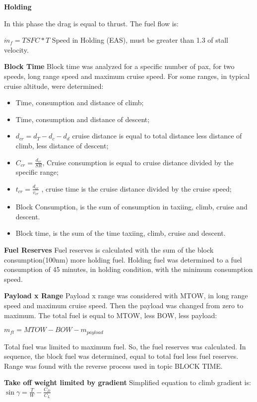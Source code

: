\textbf{Holding}

In this phase the drag is equal to thrust. The fuel flow is:

$\dot{m}_{f} = TSFC*T$
Speed in Holding (EAS), must be greater than 1.3 of stall velocity.

\textbf{Block Time}
Block time was analyzed for a specific number of pax, for two speeds, long range speed and maximum cruise speed.
	For some ranges, in typical cruise altitude, were determined:

\begin{itemize}
  \item Time, consumption and distance of climb;
  \item Time, consumption and distance of descent;
  \item $d_{cr} = d_{T} - d_{c} - d_{d}$ cruise distance is equal to total distance less distance of climb, less distance of descent;
  \item $C_{cr} = \frac{d_{cr}}{SR}$, Cruise consumption is equal to cruise distance divided by the specific range;
  \item $ t_{cr} = \frac{d_{cr}}{v_{cr}} $ , cruise time is the cruise distance divided by the cruise speed;

  \item Block Consumption, is the sum of consumption in taxiing, climb, cruise and descent.
  \item Block time, is the sum of the time taxiing, climb, cruise and descent.
\end{itemize}


\textbf{Fuel Reserves}
Fuel reserves is calculated with the sum of the block consumption(100nm) more holding fuel.
	Holding fuel was determined to a fuel consumption of 45 minutes, in holding condition, with the minimum consumption speed.
	
\textbf{Payload x Range}
Payload x range was considered with MTOW, in long range speed and maximum cruise speed. Then the payload was changed from zero to maximum.
	The total fuel is equal to MTOW, less BOW, less payload:
	
	$m_{ft} = MTOW - BOW - m_{payload}$
	
	Total fuel was limited to maximum fuel. So, the fuel reserves was calculated. In sequence, the block fuel was determined, equal to total fuel less fuel reserves.  Range was found with the reverse process used in topic BLOCK TIME.
	
\textbf{Take off weight limited by gradient}
Simplified equation to climb gradient is:
	$\sin \gamma = \frac{T}{W} - \frac{C_{D}}{C_{L}}$
	
